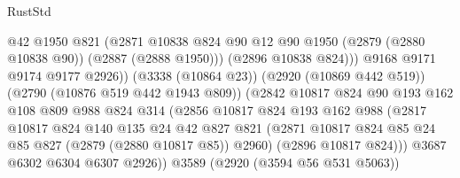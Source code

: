 \begin{lexlean}{RustStd}
\begin{coremodule}
                                    @42
                                    @1950
                                    @821
                                    (@2871
                                      @10838
                                      @824
                                      @90
                                      @12
                                      @90
                                      @1950
                                      (@2879 (@2880 @10838 @90))
                                      (@2887 (@2888 @1950)))
                                    (@2896 @10838 @824)))
                                @9168
                                @9171
                                @9174
                                @9177
                                @2926))
                            (@3338 (@10864 @23))
                            (@2920 (@10869 @442 @519))
                            (@2790 (@10876 @519 @442 @1943 @809))
                            (@2842
                              @10817
                              @824
                              @90
                              @193
                              @162
                              @108
                              @809
                              @988
                              @824
                              @314
                              (@2856
                                @10817
                                @824
                                @193
                                @162
                                @988
                                (@2817
                                  @10817
                                  @824
                                  @140
                                  @135
                                  @24
                                  @42
                                  @827
                                  @821
                                  (@2871
                                    @10817
                                    @824
                                    @85
                                    @24
                                    @85
                                    @827
                                    (@2879 (@2880 @10817 @85))
                                    @2960)
                                  (@2896 @10817 @824)))
                              @3687
                              @6302
                              @6304
                              @6307
                              @2926))
                          @3589
                          (@2920 (@3594 @56 @531 @5063))

\end{coremodule}
\end{lexlean}
